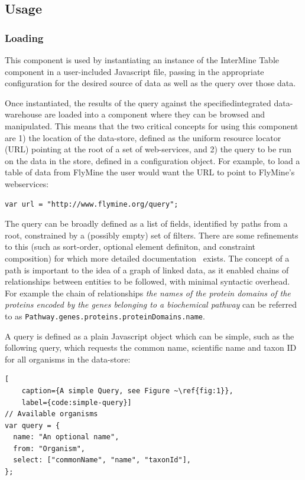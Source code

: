\documentclass[10pt,a4paper,twocolumn]{article}
\begin{document}
\subsection*{Usage}

\subsubsection*{Loading}

This component is used by instantiating an instance of the InterMine Table
component in a user-included Javascript file, passing in the appropriate
configuration for the desired source of data as well as the query over those
data.

Once instantiated, the results of the query against the specifiedintegrated
data-warehouse are loaded into a component where they can be browsed and
manipulated.  This means that the two critical concepts for using this component
are 1) the location of the data-store, defined as the uniform resource locator
(URL) pointing at the root of a set of web-services, and 2) the query to be run
on the data in the store, defined in a configuration object. For example, to
load a table of data from FlyMine the user would want the URL to point to
FlyMine's webservices:

\begin{lstlisting}[caption={Specifying the Data-Store}, label={code:set-url}]
var url = "http://www.flymine.org/query";
\end{lstlisting}

The query can be broadly defined as a list of fields, identified by
paths from a root, constrained by a (possibly empty) set of filters. There
are some refinements to this (such as sort-order, optional element definiton,
and constraint composition) for which more detailed documentation~\cite{site:pqdocs}
exists. The concept of a path is important to the idea of a graph of linked
data, as it enabled chains of relationships between entities to be followed, with
minimal syntactic overhead. For example the chain of relationships \emph{the names
of the protein domains of the proteins encoded by the genes belonging to a biochemical
pathway} can be referred to as \texttt{Pathway.genes.proteins.proteinDomains.name}.

A query is defined as a plain Javascript object which can be simple, such as the 
following query, which requests the common name, scientific name and
taxon ID for all organisms in the data-store:

\begin{lstlisting}[
    caption={A simple Query, see Figure ~\ref{fig:1}},
    label={code:simple-query}]
// Available organisms
var query = {
  name: "An optional name",
  from: "Organism",
  select: ["commonName", "name", "taxonId"],
};
\end{lstlisting}
\end{document}

